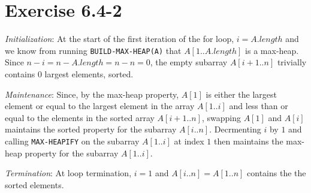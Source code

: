 \documentclass{article}
\begin{document}
\section*{Exercise 6.4-2}

\textit{Initialization}: At the start of the first iteration of the for loop, $i = A.length$ and we know from running \texttt{BUILD-MAX-HEAP(A)} that $A[1..A.length]$ is a max-heap. Since $n-i = n - A.length = n - n = 0$, the empty subarray $A[i+1 .. n]$ trivially contains 0 largest elements, sorted.

\textit{Maintenance}: Since, by the max-heap property, $A[1]$ is either the largest element or equal to the largest element in the array $A[1..i]$ and less than or equal to the elements in the sorted array $A[i+1..n]$, swapping $A[1]$ and $A[i]$ maintains the sorted property for the subarray $A[i..n]$. Decrmenting $i$ by $1$ and calling \texttt{MAX-HEAPIFY} on the subarray $A[1..i]$ at index $1$ then maintains the max-heap property for the subarray $A[1..i]$.

\textit{Termination}: At loop termination, $i=1$ and $A[i..n] = A[1..n]$ contains the the sorted elements.
\end{document}
